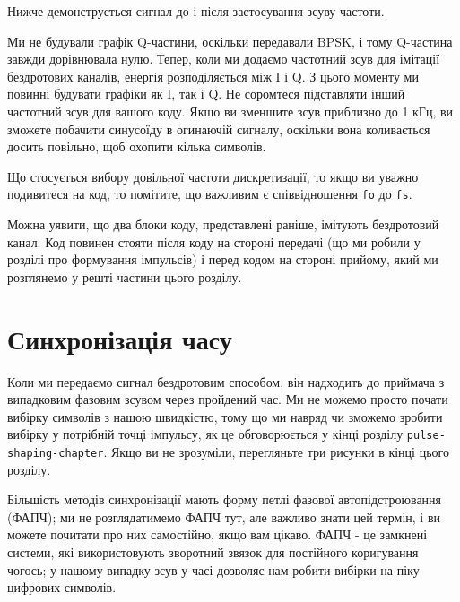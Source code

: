 Нижче демонструється сигнал до і після застосування зсуву частоти.

\href{../_images/sync-freq-offset.svg}{}

Ми не будували графік Q-частини, оскільки передавали BPSK, і тому
Q-частина завжди дорівнювала нулю. Тепер, коли ми додаємо частотний зсув
для імітації бездротових каналів, енергія розподіляється між I і Q. З
цього моменту ми повинні будувати графіки як I, так і Q. Не соромтеся
підставляти інший частотний зсув для вашого коду. Якщо ви зменшите зсув
приблизно до 1 кГц, ви зможете побачити синусоїду в огинаючій сигналу,
оскільки вона коливається досить повільно, щоб охопити кілька символів.

Що стосується вибору довільної частоти дискретизації, то якщо ви уважно
подивитеся на код, то помітите, що важливим є співвідношення \texttt{fo}
до \texttt{fs}.

Можна уявити, що два блоки коду, представлені раніше, імітують
бездротовий канал. Код повинен стояти після коду на стороні передачі (що
ми робили у розділі про формування імпульсів) і перед кодом на стороні
прийому, який ми розглянемо у решті частини цього розділу.

\section{Синхронізація
часу}\label{ux441ux438ux43dux445ux440ux43eux43dux456ux437ux430ux446ux456ux44f-ux447ux430ux441ux443}

Коли ми передаємо сигнал бездротовим способом, він надходить до приймача
з випадковим фазовим зсувом через пройдений час. Ми не можемо просто
почати вибірку символів з нашою швидкістю, тому що ми навряд чи зможемо
зробити вибірку у потрібній точці імпульсу, як це обговорюється у кінці
розділу \texttt{pulse-shaping-chapter}. Якщо ви не зрозуміли,
перегляньте три рисунки в кінці цього розділу.

Більшість методів синхронізації мають форму петлі фазової
автопідстроювання (ФАПЧ); ми не розглядатимемо ФАПЧ тут, але важливо
знати цей термін, і ви можете почитати про них самостійно, якщо вам
цікаво. ФАПЧ - це замкнені системи, які використовують зворотний
зв\textquotesingle язок для постійного коригування чогось; у нашому
випадку зсув у часі дозволяє нам робити вибірки на піку цифрових
символів.

